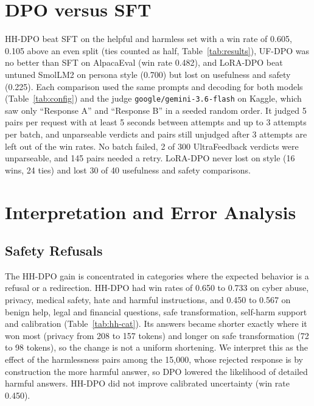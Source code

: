 \documentclass{article}
\begin{document}
\section{DPO versus SFT}
\label{sec:results}

HH-DPO beat SFT on the helpful and harmless set with a win rate of 0.605, 0.105 above an even split (ties counted as half, Table~\ref{tab:results}), UF-DPO was no better than SFT on AlpacaEval (win rate 0.482), and LoRA-DPO beat untuned SmolLM2 on persona style (0.700) but lost on usefulness and safety (0.225). Each comparison used the same prompts and decoding for both models (Table~\ref{tab:config}) and the judge \texttt{google/gemini-3.6-flash} on Kaggle, which saw only ``Response A'' and ``Response B'' in a seeded random order. It judged 5 pairs per request with at least 5 seconds between attempts and up to 3 attempts per batch, and unparseable verdicts and pairs still unjudged after 3 attempts are left out of the win rates. No batch failed, 2 of 300 UltraFeedback verdicts were unparseable, and 145 pairs needed a retry. LoRA-DPO never lost on style (16 wins, 24 ties) and lost 30 of 40 usefulness and safety comparisons.

\begin{table}[t]
  \centering
  \caption{Pairwise judgments of each DPO model against its baseline, counted from the DPO model's side. Win rate counts ties as half. Unknown verdicts could not be parsed and failures were never judged, and both are left out of the win rates. Pairs retried needed a second attempt.}
  \label{tab:results}
  \small\setlength{\tabcolsep}{4pt}
\end{table}

\section{Interpretation and Error Analysis}
\label{sec:interpretation}

\subsection{Safety Refusals}

The HH-DPO gain is concentrated in categories where the expected behavior is a refusal or a redirection. HH-DPO had win rates of 0.650 to 0.733 on cyber abuse, privacy, medical safety, hate and harmful instructions, and 0.450 to 0.567 on benign help, legal and financial questions, safe transformation, self-harm support and calibration (Table~\ref{tab:hh-cat}). Its answers became shorter exactly where it won most (privacy from 208 to 157 tokens) and longer on safe transformation (72 to 98 tokens), so the change is not a uniform shortening. We interpret this as the effect of the \hhHarmless{} harmlessness pairs among the 15,000, whose rejected response is by construction the more harmful answer, so DPO lowered the likelihood of detailed harmful answers. HH-DPO did not improve calibrated uncertainty (win rate 0.450).
\end{document}
